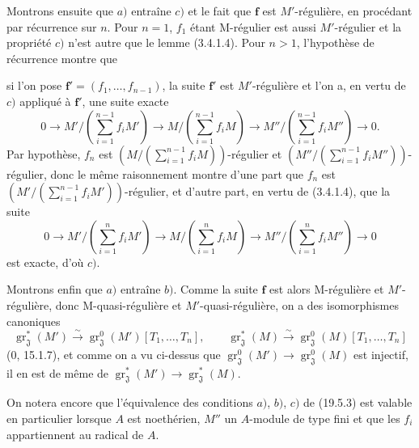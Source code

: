 Montrons ensuite que $a)$ entraîne $c)$ et le fait que $\mathbf f$ est $M'$-régulière, en procédant par récurrence sur $n$. Pour $n=1$, $f_1$ étant M-régulier est aussi $M'$-régulier et la propriété $c)$ n'est autre que le lemme (3.4.1.4). Pour $n>1$, l'hypothèse de récurrence montre que


si l'on pose $\mathbf f'=(f_1,\ldots,f_{n-1})$, la suite $\mathbf f'$ est $M'$-régulière et l'on a, en vertu de $c)$ appliqué à $\mathbf f'$, une suite exacte
\[
  0\longrightarrow M'/(\textstyle\sum_{i=1}^{n-1}f_iM')\longrightarrow M/(\textstyle\sum_{i=1}^{n-1}f_iM)\longrightarrow M''/(\textstyle\sum_{i=1}^{n-1}f_iM'')\longrightarrow0.
\]
Par hypothèse, $f_n$ est $(M/(\sum_{i=1}^{n-1}f_iM))$-régulier et $(M''/(\sum_{i=1}^{n-1}f_iM''))$-régulier, donc le même raisonnement montre d'une part que $f_n$ est $(M'/(\sum_{i=1}^{n-1}f_iM'))$-régulier, et d'autre part, en vertu de (3.4.1.4), que la suite
\[
  0\longrightarrow M'/(\textstyle\sum_{i=1}^{n}f_iM')\longrightarrow M/(\textstyle\sum_{i=1}^{n}f_iM)\longrightarrow M''/(\textstyle\sum_{i=1}^{n}f_iM'')\longrightarrow0
\]
est exacte, d'où $c)$.

Montrons enfin que $a)$ entraîne $b)$. Comme la suite $\mathbf f$ est alors M-régulière et $M'$-régulière, donc M-quasi-régulière et $M'$-quasi-régulière, on a des isomorphismes canoniques
\[
  \operatorname{gr}_{\mathfrak J}^*(M')\xrightarrow{\sim}\operatorname{gr}_{\mathfrak J}^0(M')[T_1,\ldots,T_n],
  \qquad
  \operatorname{gr}_{\mathfrak J}^*(M)\xrightarrow{\sim}\operatorname{gr}_{\mathfrak J}^0(M)[T_1,\ldots,T_n]
\]
($0$, 15.1.7), et comme on a vu ci-dessus que $\operatorname{gr}_{\mathfrak J}^0(M')\to\operatorname{gr}_{\mathfrak J}^0(M)$ est injectif, il en est de même de $\operatorname{gr}_{\mathfrak J}^*(M')\to\operatorname{gr}_{\mathfrak J}^*(M)$.

On notera encore que l'équivalence des conditions $a)$, $b)$, $c)$ de (19.5.3) est valable en particulier lorsque $A$ est noethérien, $M''$ un $A$-module de type fini et que les $f_i$ appartiennent au radical de $A$.


